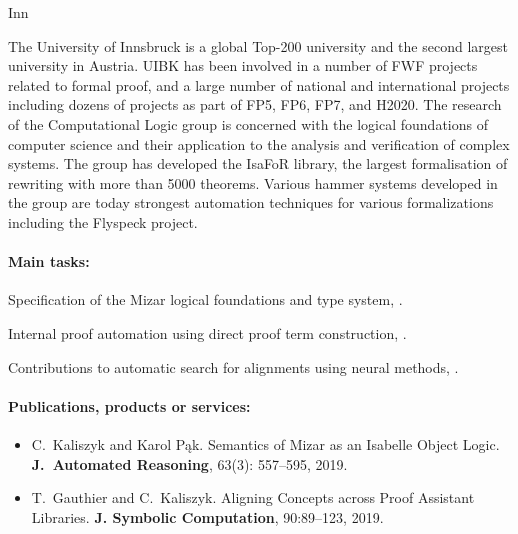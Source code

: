 \begin{sitedescription}{Inn}

The University of Innsbruck is a global Top-200 university and the second
largest university in Austria. UIBK has been involved in a number of FWF
projects related to formal proof, and a large number of national and
international projects including dozens of projects as part of FP5,
FP6, FP7, and H2020.
%
The research of the Computational Logic group is concerned with the logical
foundations of computer science and their application to the analysis and
verification of complex systems. The group has developed the IsaFoR library,
the largest formalisation of rewriting with more than 5000 theorems. Various
hammer systems developed in the group are today strongest automation techniques
for various formalizations including the Flyspeck project.

\paragraph{Main tasks:}

\begin{compactitem}
\item Specification of the Mizar logical foundations and type system,  .
\item Internal proof automation using direct proof term construction, %
   .
\item Contributions to automatic search for alignments using neural methods,  .
\end{compactitem}

\paragraph{Publications, products or services:}
\begin{itemize}
\item
C.~Kaliszyk and Karol Pąk.
\newblock Semantics of Mizar as an Isabelle Object Logic.
\textbf{J.~Automated Reasoning}, 63(3): 557--595, 2019.

\item
T.~Gauthier and C.~Kaliszyk.
\newblock Aligning Concepts across Proof Assistant Libraries.
\textbf{J. Symbolic Computation}, 90:89--123, 2019.


\end{itemize}
\end{sitedescription}
